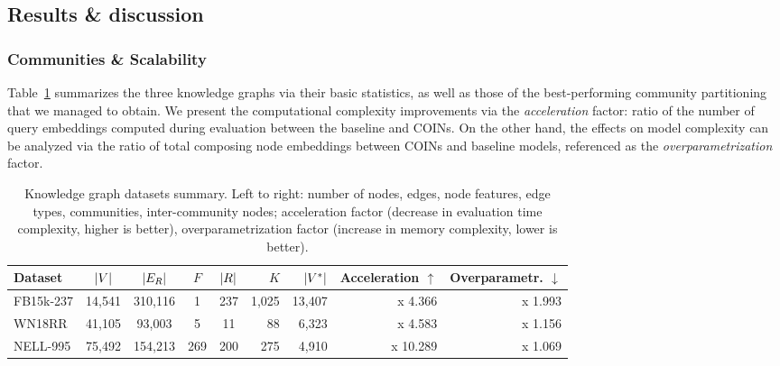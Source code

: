 \subsection{Results \& discussion}
\label{sec:results}

\subsubsection{Communities \& Scalability}

Table~\ref{tab:datasets} summarizes the three knowledge graphs via their basic statistics, as well as those of the best-performing community partitioning that we managed to obtain. We present the computational complexity improvements via the \emph{acceleration} factor: ratio of the number of query embeddings computed during evaluation between the baseline and COINs. On the other hand, the effects on model complexity can be analyzed via the ratio of total composing node embeddings between COINs and baseline models, referenced as the \emph{overparametrization} factor. 

\begin{table}[H]
  \caption[Knowledge graph datasets summary.]{Knowledge graph datasets summary. Left to right: number of nodes, edges, node features, edge types, communities, inter-community nodes; acceleration factor (decrease in evaluation time complexity, higher is better), overparametrization factor (increase in memory complexity, lower is better).}
  \label{tab:datasets}
  \centering
  \begin{adjustbox}{width=\textwidth}
  \begin{tabular}{lccccrrrr}
    \toprule
    Dataset & $\mathopen{}\left|V\right|$ & $\mathopen{}\left|E_R\right|$ & $F$ & $\mathopen{}\left|R\right|$ & $K$ & $\mathopen{}\left|V^*\right|$ & Acceleration $\uparrow$ & Overparametr. $\downarrow$ \\ %
    \midrule
    FB15k-237 & 14,541 & 310,116 & 1 & 237 & 1,025 & 13,407 & x 4.366 & x 1.993 \\
    WN18RR & 41,105 & 93,003 & 5 & 11 & 88 & 6,323 & x 4.583 & x 1.156 \\
    NELL-995 & 75,492 & 154,213 & 269 & 200 & 275 & 4,910 & x 10.289 & x 1.069 \\
    \bottomrule
  \end{tabular}
  \end{adjustbox}
\end{table}

